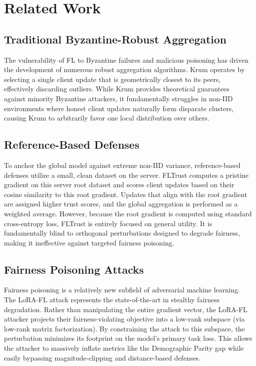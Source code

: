 \documentclass[journal]{IEEEtran}
\begin{document}
\section{Related Work}
\subsection{Traditional Byzantine-Robust Aggregation}
The vulnerability of FL to Byzantine failures and malicious poisoning has driven the development of numerous robust aggregation algorithms. Krum \cite{blanchard2017machine} operates by selecting a single client update that is geometrically closest to its peers, effectively discarding outliers. While Krum provides theoretical guarantees against minority Byzantine attackers, it fundamentally struggles in non-IID environments where honest client updates naturally form disparate clusters, causing Krum to arbitrarily favor one local distribution over others.

\subsection{Reference-Based Defenses}
To anchor the global model against extreme non-IID variance, reference-based defenses utilize a small, clean dataset on the server. FLTrust \cite{cao2021fltrust} computes a pristine gradient on this server root dataset and scores client updates based on their cosine similarity to this root gradient. Updates that align with the root gradient are assigned higher trust scores, and the global aggregation is performed as a weighted average. However, because the root gradient is computed using standard cross-entropy loss, FLTrust is entirely focused on general utility. It is fundamentally blind to orthogonal perturbations designed to degrade fairness, making it ineffective against targeted fairness poisoning.

\subsection{Fairness Poisoning Attacks}
Fairness poisoning is a relatively new subfield of adversarial machine learning. The LoRA-FL attack \cite{lorafl2024} represents the state-of-the-art in stealthy fairness degradation. Rather than manipulating the entire gradient vector, the LoRA-FL attacker projects their fairness-violating objective into a low-rank subspace (via low-rank matrix factorization). By constraining the attack to this subspace, the perturbation minimizes its footprint on the model's primary task loss. This allows the attacker to massively inflate metrics like the Demographic Parity gap while easily bypassing magnitude-clipping and distance-based defenses.
\end{document}

